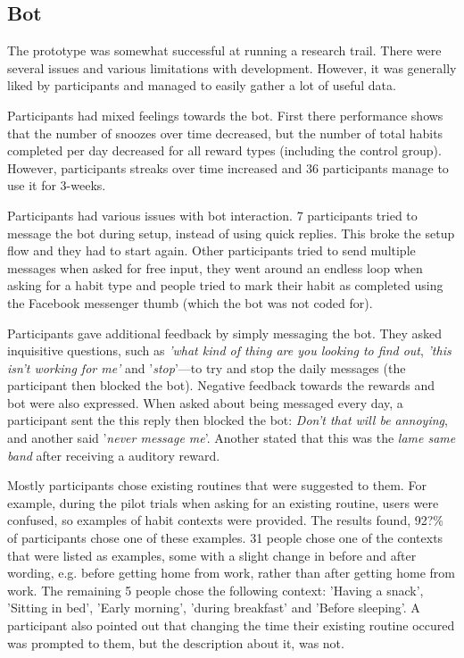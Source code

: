 \documentclass{scaffold/sigchi}
\begin{document}
\subsection{Bot}
The prototype was somewhat successful at running a research trail. There were several issues and various limitations with development. However, it was generally liked by participants and managed to easily gather a lot of useful data.

Participants had mixed feelings towards the bot. First there performance shows that the number of snoozes over time decreased, but the number of total habits completed per day decreased for all reward types (including the control group). However, participants streaks over time increased and 36 participants manage to use it for 3-weeks.

Participants had various issues with bot interaction. 7 participants tried to message the bot during setup, instead of using quick replies. This broke the setup flow and they had to start again. Other participants tried to send multiple messages when asked for free input, they went around an endless loop when asking for a habit type and people tried to mark their habit as completed using the Facebook messenger thumb (which the bot was not coded for).

Participants gave additional feedback by simply messaging the bot. They asked inquisitive questions, such as \textit{'what kind of thing are you looking to find out}, \textit{'this isn't working for me'} and '\textit{stop}'---to try and stop the daily messages (the participant then blocked the bot). Negative feedback towards the rewards and bot were also expressed. When asked about being messaged every day, a participant sent the this reply then blocked the bot: \textit{Don't that will be annoying}, and another said '\textit{never message me}'. Another stated that this was the \textit{lame same band} after receiving a auditory reward.

Mostly participants chose existing routines that were suggested to them. For example, during the pilot trials when asking for an existing routine, users were confused, so examples of habit contexts were provided. The results found, 92?\% of participants chose one of these examples. 31 people chose one of the contexts that were listed as examples, some with a slight change in before and after wording, e.g. before getting home from work, rather than after getting home from work. The remaining 5 people chose the following context: 'Having a snack', 'Sitting in bed', 'Early morning', 'during breakfast' and 'Before sleeping'. A participant also pointed out that changing the time their existing routine occured was prompted to them, but the description about it, was not.
\end{document}
